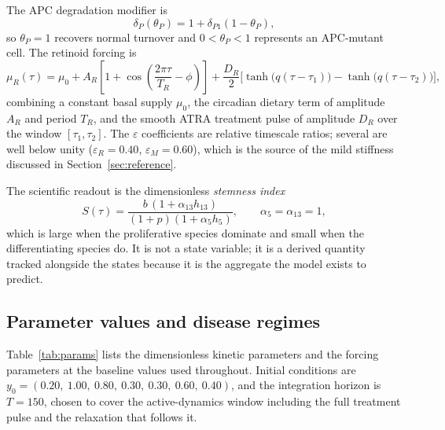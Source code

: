 \documentclass[11pt]{article}
\newcommand{\thP}{\theta_P}
\begin{document}
The APC degradation modifier is
\begin{equation}
\delta_P(\thP) = 1 + \delta_{P1}(1-\thP),
\label{eq:deltaP}
\end{equation}
so $\thP = 1$ recovers normal turnover and $0 < \thP < 1$ represents an
APC-mutant cell. The retinoid forcing is
\begin{equation}
\mu_R(\tau) = \mu_0
+ A_R\left[1+\cos\!\left(\frac{2\pi\tau}{T_R}-\phi\right)\right]
+ \frac{D_R}{2}\Big[\tanh\!\big(q(\tau-\tau_1)\big)
- \tanh\!\big(q(\tau-\tau_2)\big)\Big],
\label{eq:forcing}
\end{equation}
combining a constant basal supply $\mu_0$, the circadian dietary term of
amplitude $A_R$ and period $T_R$, and the smooth ATRA treatment pulse of
amplitude $D_R$ over the window $[\tau_1,\tau_2]$. The $\varepsilon$
coefficients are relative timescale ratios; several are well below unity
($\varepsilon_R = 0.40$, $\varepsilon_M = 0.60$), which is the source of the
mild stiffness discussed in Section~\ref{sec:reference}.

The scientific readout is the dimensionless \emph{stemness index}
\begin{equation}
S(\tau) = \frac{b\,(1+\alpha_{13}h_{13})}{(1+p)(1+\alpha_5h_5)},
\qquad \alpha_5 = \alpha_{13} = 1,
\label{eq:stemness}
\end{equation}
which is large when the proliferative species dominate and small when the
differentiating species do. It is not a state variable; it is a derived
quantity tracked alongside the states because it is the aggregate the model
exists to predict.

\subsection{Parameter values and disease regimes}

Table~\ref{tab:params} lists the dimensionless kinetic parameters and the
forcing parameters at the baseline values used throughout. Initial conditions
are $y_0 = (0.20,\ 1.00,\ 0.80,\ 0.30,\ 0.30,\ 0.60,\ 0.40)$, and the
integration horizon is $T = 150$, chosen to cover the active-dynamics window
including the full treatment pulse and the relaxation that follows it.
\end{document}
